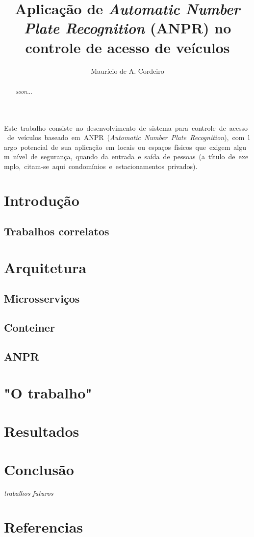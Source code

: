 \documentclass[12pt]{article}
\title{Aplicação de \textit{Automatic Number Plate Recognition} (ANPR) no controle de acesso de veículos}
\author{Maurício de A. Cordeiro\inst{1} }
\begin{document}
 

\maketitle

\begin{abstract}
  \textit{soon...}
\end{abstract}
     
\begin{resumo} 
 \hbox{Este trabalho consiste no desenvolvimento de sistema para controle de acesso de veículos baseado em ANPR (\textit{Automatic Number Plate Recognition}), com largo potencial de sua aplicação em locais ou espaços físicos que exigem algum nível de segurança, quando da entrada e saída de pessoas (a título de exemplo, citam-se aqui condomínios e estacionamentos privados). }
\end{resumo}

\section{Introdução}

\subsection{Trabalhos correlatos}


\section{Arquitetura}

\cite{viggiato2018}

\subsection{Microsserviços}

\subsection{Conteiner}

\subsection{ANPR}

\section{"O trabalho"}


\section{Resultados}


\section{Conclusão}

\textit{trabalhos futuros}


\section{Referencias}




\end{document}
